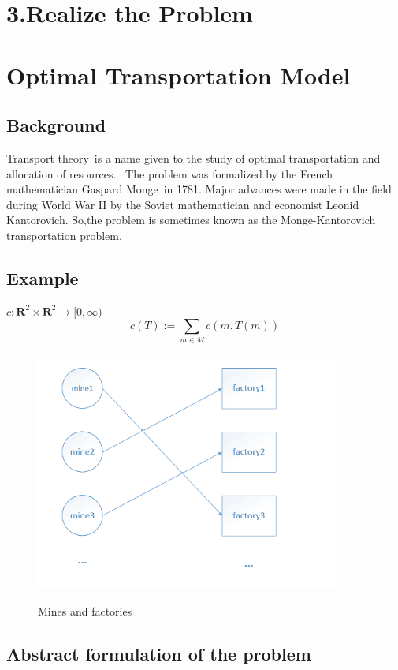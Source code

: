 \documentclass[12pt]{article}
\begin{document}
\section*{3.Realize the Problem}
\newpage
\section{Optimal Transportation Model}

  \subsection{Background}
    Transport theory is a name given to the study of optimal transportation and allocation of resources.  The problem was formalized by the French mathematician Gaspard Monge in 1781. Major advances were made in the field during World War II by the Soviet mathematician and economist Leonid Kantorovich. So,the problem is sometimes known as the Monge-Kantorovich transportation problem.
  \subsection{Example}

  $c: \mathbf{R}^{2}\times \mathbf{R}^{2}\rightarrow [0,\infty)$
  $$c(T):=\sum_{m\in M}c(m,T(m))$$

  \newpage
\begin{figure}
  \centering
  \includegraphics[width=10cm]{1.png}\\
  \caption{Mines and factories}
\end{figure}

\subsection{Abstract formulation of the problem}
\end{document}
